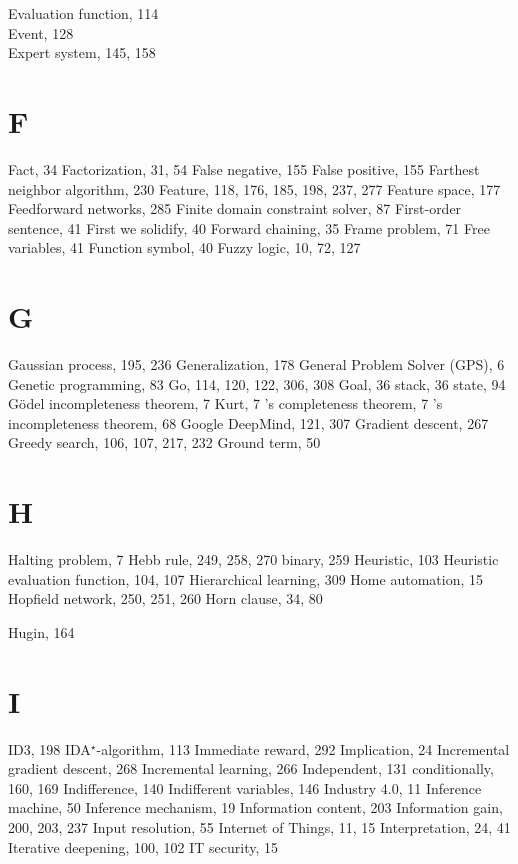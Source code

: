 \documentclass[10pt]{book}
\begin{document}
Evaluation function, 114\\
Event, 128\\
Expert system, 145, 158\\
\section{F}

Fact, 34
Factorization, 31, 54
False negative, 155
False positive, 155
Farthest neighbor algorithm, 230
Feature, 118, 176, 185, 198, 237, 277
Feature space, 177
Feedforward networks, 285
Finite domain constraint solver, 87
First-order sentence, 41
First we solidify, 40
Forward chaining, 35
Frame problem, 71
Free variables, 41
Function symbol, 40
Fuzzy logic, 10, 72, 127

\section{G}

Gaussian process, 195, 236
Generalization, 178
General Problem Solver (GPS), 6
Genetic programming, 83
Go, 114, 120, 122, 306, 308
Goal, 36
stack, 36
state, 94
Gödel
incompleteness theorem, 7
Kurt, 7
's completeness theorem, 7
's incompleteness theorem, 68
Google DeepMind, 121, 307
Gradient descent, 267
Greedy search, 106, 107, 217, 232
Ground term, 50

\section{H}

Halting problem, 7
Hebb rule, 249, 258, 270
binary, 259
Heuristic, 103
Heuristic evaluation function, 104, 107
Hierarchical learning, 309
Home automation, 15
Hopfield network, 250, 251, 260
Horn clause, 34, 80

Hugin, 164

\section{I}

ID3, 198
IDA$^{\star}$-algorithm, 113
Immediate reward, 292
Implication, 24
Incremental gradient descent, 268
Incremental learning, 266
Independent, 131
conditionally, 160, 169
Indifference, 140
Indifferent variables, 146
Industry 4.0, 11
Inference machine, 50
Inference mechanism, 19
Information content, 203
Information gain, 200, 203, 237
Input resolution, 55
Internet of Things, 11, 15
Interpretation, 24, 41
Iterative deepening, 100, 102
IT security, 15
\end{document}
